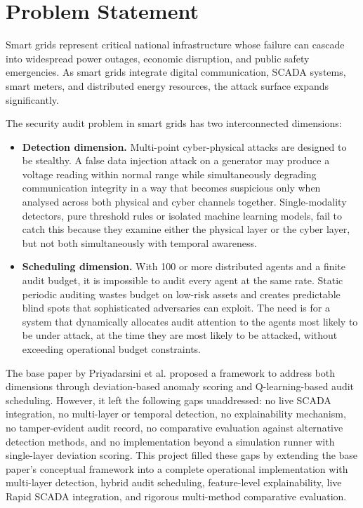 \section{Problem Statement}

Smart grids represent critical national infrastructure whose failure can cascade into widespread power outages, economic disruption, and public safety emergencies. As smart grids integrate digital communication, SCADA systems, smart meters, and distributed energy resources, the attack surface expands significantly.

The security audit problem in smart grids has two interconnected dimensions:

\begin{itemize}
    \item \textbf{Detection dimension.} Multi-point cyber-physical attacks are designed to be stealthy. A false data injection attack on a generator may produce a voltage reading within normal range while simultaneously degrading communication integrity in a way that becomes suspicious only when analysed across both physical and cyber channels together. Single-modality detectors, pure threshold rules or isolated machine learning models, fail to catch this because they examine either the physical layer or the cyber layer, but not both simultaneously with temporal awareness.

    \item \textbf{Scheduling dimension.} With 100 or more distributed agents and a finite audit budget, it is impossible to audit every agent at the same rate. Static periodic auditing wastes budget on low-risk assets and creates predictable blind spots that sophisticated adversaries can exploit. The need is for a system that dynamically allocates audit attention to the agents most likely to be under attack, at the time they are most likely to be attacked, without exceeding operational budget constraints.
\end{itemize}

The base paper by Priyadarsini et al. \cite{priyadarsini2025enhancing} proposed a framework to address both dimensions through deviation-based anomaly scoring and Q-learning-based audit scheduling. However, it left the following gaps unaddressed: no live SCADA integration, no multi-layer or temporal detection, no explainability mechanism, no tamper-evident audit record, no comparative evaluation against alternative detection methods, and no implementation beyond a simulation runner with single-layer deviation scoring. This project filled these gaps by extending the base paper's conceptual framework into a complete operational implementation with multi-layer detection, hybrid audit scheduling, feature-level explainability, live Rapid SCADA integration, and rigorous multi-method comparative evaluation.
